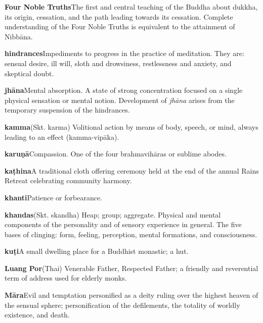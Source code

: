 {\textbf{Four Noble Truths}\hspace{\glosskip}The first and central teaching of the Buddha 
about dukkha, its origin, cessation, and the path leading towards its 
cessation. Complete understanding of the Four Noble Truths is 
equivalent to the attainment of Nibbāna.

\textbf{hindrances}\hspace{\glosskip}Impediments to progress in the practice of 
meditation. They are: sensual desire, ill will, sloth and drowsiness, 
restlessness and anxiety, and skeptical doubt.

\textbf{jhāna}\hspace{\glosskip}Mental absorption. A state of strong concentration 
focused on a single physical sensation or mental notion. Development of 
\emph{jhāna} arises from the temporary suspension of the hindrances.

\textbf{kamma}\hspace{\glosskip}(Skt. karma) Volitional action by means of body, speech, 
or mind, always leading to an effect (kamma-vipāka).

\textbf{karuṇā}\hspace{\glosskip}Compassion. One of the four brahmavihāras or 
sublime abodes.

\textbf{kaṭhina}\hspace{\glosskip}A traditional cloth offering ceremony held at the 
end of the annual Rains Retreat celebrating community harmony.

\textbf{khanti}\hspace{\glosskip}Patience or forbearance.

\textbf{khandas}\hspace{\glosskip}(Skt. skandha) Heap; group; aggregate. Physical and 
mental components of the personality and of sensory experience in 
general. The five bases of clinging: form, feeling, perception, mental 
formations, and consciousness.

\textbf{kuṭi}\hspace{\glosskip}A small dwelling place for a Buddhist monastic; a hut.

\textbf{Luang Por}\hspace{\glosskip}(Thai) Venerable Father, Respected Father; a 
friendly and reverential term of address used for elderly monks.

\textbf{Māra}\hspace{\glosskip}Evil and temptation personified as a deity ruling over 
the highest heaven of the sensual sphere; personification of the 
defilements, the totality of worldly existence, and death.

}
